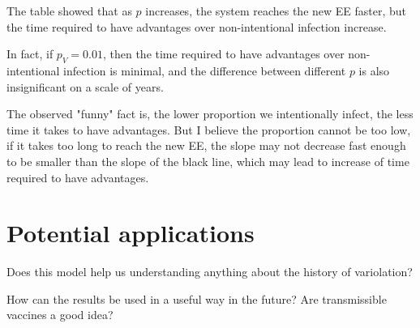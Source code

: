 \documentclass[12pt]{article}
\newcommand{\pmV}{p_{V}}
\begin{document}
The table showed that as $p$ increases, the system reaches the new EE faster, but the time required to have advantages over non-intentional infection increase.

In fact, if $\pmV=0.01$, then the time required to have advantages over non-intentional infection is minimal, and the difference between different $p$ is also insignificant on a scale of years.

The observed "funny" fact is, the lower proportion we intentionally infect, the less time it takes to have advantages. But I believe the proportion cannot be too low, if it takes too long to reach the new EE, the slope may not decrease fast enough to be smaller than the slope of the black line, which may lead to increase of time required to have advantages.

\section{Potential applications}

Does this model help us understanding anything about the history of variolation?

How can the results be used in a useful way in the future?
Are transmissible vaccines a good idea?
\end{document}
